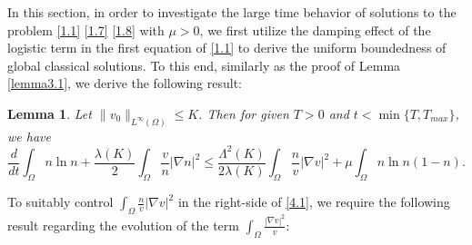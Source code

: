 \documentclass[12pt]{article}
\theoremstyle{plain}
\newtheorem{lemma}{Lemma}[section]
\theoremstyle{definition}
\numberwithin{equation}{section}
\begin{document}
  In this section, in order to investigate the large time behavior of solutions to the  problem \eqref{1.1} \eqref{1.7} \eqref{1.8} with $\mu>0$,  we first utilize the damping effect of the logistic term  in the first equation of  \eqref{1.1} to   derive  the uniform boundedness of global classical solutions.
  To this end, similarly as the proof of Lemma \ref{lemma3.1}, we  derive the following result:
\begin{lemma}\label{lemma4.1} Let $\|v_{0}\|_{L^{\infty}(\Omega)}\leq K$.  Then for given $T>0$  and $t<\min\{T,T_{max}\}$, we have
	\begin{equation}\label{4.1}
\frac d{dt}\int_\Omega n\ln n+
\frac{\lambda(K)} 2\int_\Omega\frac{v}{n}|\nabla n|^2
\leq \frac{\Lambda^2(K)}{2\lambda(K)}
 \int_\Omega\frac nv |\nabla v|^2+\mu \int_\Omega n\ln n(1-n).
\end{equation}
\end{lemma}
To suitably control  $\int_\Omega\frac nv |\nabla v|^2 $ in the right-side of \eqref{4.1}, we require the
following result regarding the evolution of the term $\int_\Omega  \frac{|\nabla v|^2}v$:
\end{document}
